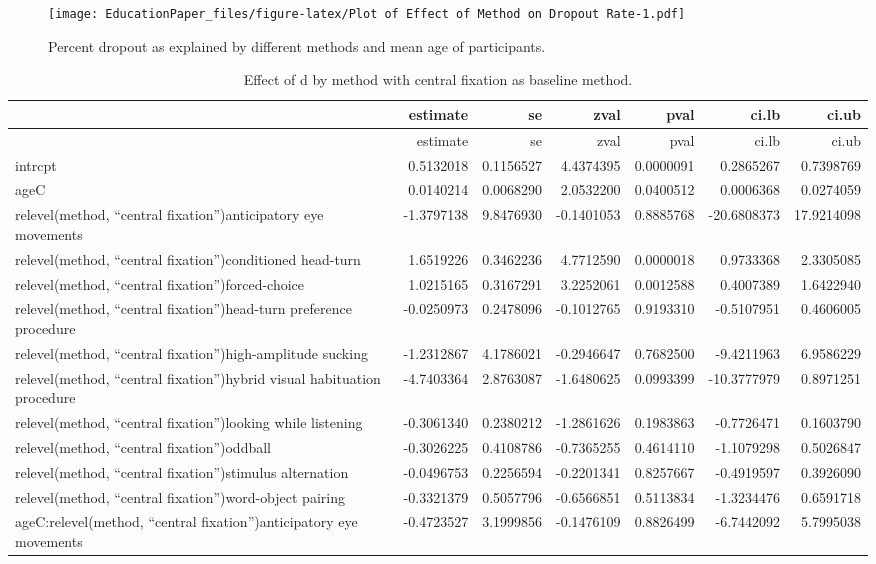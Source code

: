 \documentclass[english,floatsintext,man]{apa6}
\begin{document}
\begin{figure}[htbp]
\centering
\texttt{[image: EducationPaper\_files/figure-latex/Plot of Effect of Method on Dropout Rate-1.pdf]}
\caption{Percent dropout as explained by different methods and mean age
of participants.}
\end{figure}

\begin{longtable}[c]{@{}lrrrrrr@{}}
\caption{Effect of d by method with central fixation as baseline
method.}\tabularnewline
\toprule
& estimate & se & zval & pval & ci.lb & ci.ub\tabularnewline
\midrule
\endfirsthead
\toprule
& estimate & se & zval & pval & ci.lb & ci.ub\tabularnewline
\midrule
\endhead
intrcpt & 0.5132018 & 0.1156527 & 4.4374395 & 0.0000091 & 0.2865267 &
0.7398769\tabularnewline
ageC & 0.0140214 & 0.0068290 & 2.0532200 & 0.0400512 & 0.0006368 &
0.0274059\tabularnewline
relevel(method, \enquote{central fixation})anticipatory eye movements &
-1.3797138 & 9.8476930 & -0.1401053 & 0.8885768 & -20.6808373 &
17.9214098\tabularnewline
relevel(method, \enquote{central fixation})conditioned head-turn &
1.6519226 & 0.3462236 & 4.7712590 & 0.0000018 & 0.9733368 &
2.3305085\tabularnewline
relevel(method, \enquote{central fixation})forced-choice & 1.0215165 &
0.3167291 & 3.2252061 & 0.0012588 & 0.4007389 & 1.6422940\tabularnewline
relevel(method, \enquote{central fixation})head-turn preference
procedure & -0.0250973 & 0.2478096 & -0.1012765 & 0.9193310 & -0.5107951
& 0.4606005\tabularnewline
relevel(method, \enquote{central fixation})high-amplitude sucking &
-1.2312867 & 4.1786021 & -0.2946647 & 0.7682500 & -9.4211963 &
6.9586229\tabularnewline
relevel(method, \enquote{central fixation})hybrid visual habituation
procedure & -4.7403364 & 2.8763087 & -1.6480625 & 0.0993399 &
-10.3777979 & 0.8971251\tabularnewline
relevel(method, \enquote{central fixation})looking while listening &
-0.3061340 & 0.2380212 & -1.2861626 & 0.1983863 & -0.7726471 &
0.1603790\tabularnewline
relevel(method, \enquote{central fixation})oddball & -0.3026225 &
0.4108786 & -0.7365255 & 0.4614110 & -1.1079298 &
0.5026847\tabularnewline
relevel(method, \enquote{central fixation})stimulus alternation &
-0.0496753 & 0.2256594 & -0.2201341 & 0.8257667 & -0.4919597 &
0.3926090\tabularnewline
relevel(method, \enquote{central fixation})word-object pairing &
-0.3321379 & 0.5057796 & -0.6566851 & 0.5113834 & -1.3234476 &
0.6591718\tabularnewline
ageC:relevel(method, \enquote{central fixation})anticipatory eye
movements & -0.4723527 & 3.1999856 & -0.1476109 & 0.8826499 & -6.7442092
& 5.7995038\tabularnewline

\end{longtable}
\end{document}
